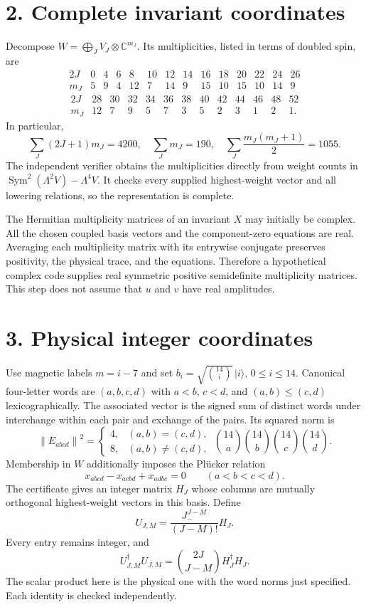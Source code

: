 \documentclass[11pt]{article}
\newcommand{\Sym}{\operatorname{Sym}}
\begin{document}
\section*{2. Complete invariant coordinates}
Decompose $W=\bigoplus_J V_J\otimes\mathbb C^{m_J}$. Its multiplicities, listed in terms of doubled spin, are
\[
\begin{array}{c|rrrrrrrrrrrrr}
2J&0&4&6&8&10&12&14&16&18&20&22&24&26\\\hline
m_J&5&9&4&12&7&14&9&15&10&15&10&14&9
\end{array}
\]
\[
\begin{array}{c|rrrrrrrrrrrr}
2J&28&30&32&34&36&38&40&42&44&46&48&52\\\hline
m_J&12&7&9&5&7&3&5&2&3&1&2&1.
\end{array}
\]
In particular,
\[
 \sum_J(2J+1)m_J=4200,\quad \sum_Jm_J=190,
 \quad \sum_J\frac{m_J(m_J+1)}2=1055.
\]
The independent verifier obtains the multiplicities directly from weight counts in $\Sym^2(\Lambda^2V)-\Lambda^4V$. It checks every supplied highest-weight vector and all lowering relations, so the representation is complete.

The Hermitian multiplicity matrices of an invariant $X$ may initially be complex. All the chosen coupled basis vectors and the component-zero equations are real. Averaging each multiplicity matrix with its entrywise conjugate preserves positivity, the physical trace, and the equations. Therefore a hypothetical complex code supplies real symmetric positive semidefinite multiplicity matrices. This step does not assume that $u$ and $v$ have real amplitudes.

\section*{3. Physical integer coordinates}
Use magnetic labels $m=i-7$ and set
$b_i=\sqrt{\binom{14}{i}}\,|i\rangle$, $0\le i\le14$.
Canonical four-letter words are $(a,b,c,d)$ with $a<b$, $c<d$, and $(a,b)\le(c,d)$ lexicographically. The associated vector is the signed sum of distinct words under interchange within each pair and exchange of the pairs. Its squared norm is
\[
 \left\|E_{abcd}\right\|^2=
 \begin{cases}4,&(a,b)=(c,d),\\8,&(a,b)\ne(c,d),\end{cases}
 \ \binom{14}{a}\binom{14}{b}\binom{14}{c}\binom{14}{d}.
\]
Membership in $W$ additionally imposes the Pl\"ucker relation
\[
 x_{abcd}-x_{acbd}+x_{adbc}=0\qquad(a<b<c<d).
\]
The certificate gives an integer matrix $H_J$ whose columns are mutually orthogonal highest-weight vectors in this basis. Define
\[
 U_{J,M}=\frac{J_-^{J-M}}{(J-M)!}H_J.
\]
Every entry remains integer, and
\[
 U_{J,M}^\dagger U_{J,M}
 =\binom{2J}{J-M}H_J^\dagger H_J.
\]
The scalar product here is the physical one with the word norms just specified. Each identity is checked independently.
\end{document}
